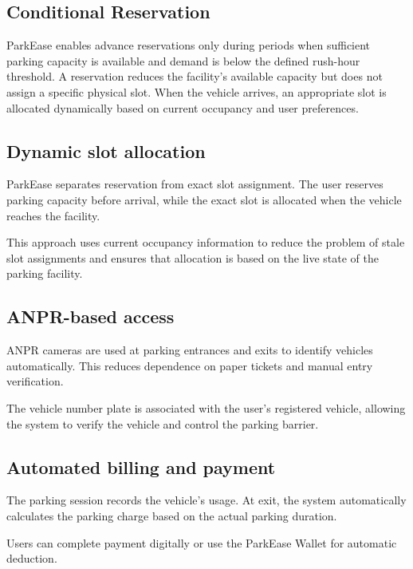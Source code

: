 \documentclass[12pt,a4paper]{article}
\begin{document}
\subsection{Conditional Reservation}

 ParkEase enables advance reservations only during periods when sufficient parking capacity is available and demand is below the defined rush-hour threshold. A reservation reduces the facility's available capacity but does not assign a specific physical slot. When the vehicle arrives, an appropriate slot is allocated dynamically based on current occupancy and user preferences.
 
\subsection{Dynamic slot allocation}

ParkEase separates reservation from exact slot assignment. The user reserves parking capacity before arrival, while the exact slot is allocated when the vehicle reaches the facility.

This approach uses current occupancy information to reduce the problem of stale slot assignments and ensures that allocation is based on the live state of the parking facility.

\subsection{ANPR-based access}

ANPR cameras are used at parking entrances and exits to identify vehicles automatically. This reduces dependence on paper tickets and manual entry verification.

The vehicle number plate is associated with the user's registered vehicle, allowing the system to verify the vehicle and control the parking barrier.

\subsection{Automated billing and payment}

The parking session records the vehicle's usage. At exit, the system automatically calculates the parking charge based on the actual parking duration.

Users can complete payment digitally or use the ParkEase Wallet for automatic deduction.

\end{document}
